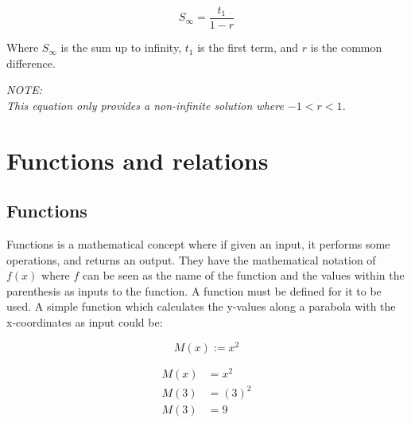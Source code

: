 \documentclass{book}
\newenvironment{generalInformation}{}{}
\newenvironment{note}{\begin{center}\em NOTE:\\}{\end{center}}
\begin{document}
\[
	S_{\infty} = \frac{t_1}{1 - r}
\]

Where $S_{\infty}$ is the sum up to infinity, $t_1$ is the first term, and $r$ is the common difference.

\begin{note}
	This equation only provides a non-infinite solution where $-1 < r < 1$.
\end{note}




\chapter{Functions and relations}
\section{Functions}
\begin{generalInformation}
	Functions is a mathematical concept where if given an input, it performs some operations, and returns an output.  They have the mathematical notation of $f(x)$ where $f$ can be seen as the name of the function and the values within the parenthesis as inputs to the function.  A function must be defined for it to be used.  A simple function which calculates the y-values along a parabola with the x-coordinates as input could be:
\end{generalInformation}

\[
	M(x) := x^2
\]

\begin{align*}
	M(x) & = x^2   \\
	M(3) & = (3)^2 \\
	M(3) & = 9
\end{align*}
\end{document}
